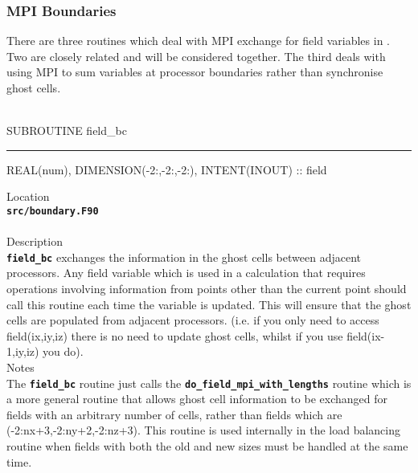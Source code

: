 \documentclass[12pt,a4paper]{article}
\newcommand{\HRule}{\rule[0.3cm]{\linewidth}{0.5mm}}
\newcommand{\inlinecode}[1]{{\color{warwickred} \bf\texttt{#1}}}
\newcommand{\EPOCH}{{\color{warwickdark}\fontfamily{phv}\selectfont{EPOCH}}}
\begin{document}
\subsubsection{MPI Boundaries}
There are three routines which deal with MPI exchange for field variables in
{\EPOCH}. Two are closely related and will be considered together. The third
deals with using MPI to sum variables at processor boundaries rather than
synchronise ghost cells.\\\\

\begin{codedef}
SUBROUTINE field_bc
\HRule
REAL(num), DIMENSION(-2:,-2:,-2:), INTENT(INOUT) :: field
\end{codedef}
\vspace{1cm}
{\Large Location\\}
\inlinecode{src/boundary.F90}\\
\\[0.5cm]
{\Large Description\\}
\inlinecode{field\_bc} exchanges the information in the ghost cells between
adjacent processors. Any field variable which is used in a calculation that
requires operations involving information from points other than the
current point should call this routine each time the variable is updated. This
will ensure that the ghost cells are populated from adjacent processors.
(i.e. if you only need to access field(ix,iy,iz) there is no need to update
ghost cells, whilst if you use field(ix-1,iy,iz) you do).
\\[0.5cm]
{\Large Notes\\}
The \inlinecode{field\_bc} routine just calls the
\inlinecode{do\_field\_mpi\_with\_lengths} routine which is a more general
routine that allows ghost cell information to be exchanged for fields with
an arbitrary number of cells, rather than fields which are
(-2:nx+3,-2:ny+2,-2:nz+3). This routine is used internally in the load
balancing routine when fields with both the old and new sizes must be handled
at the same time.
\end{document}

